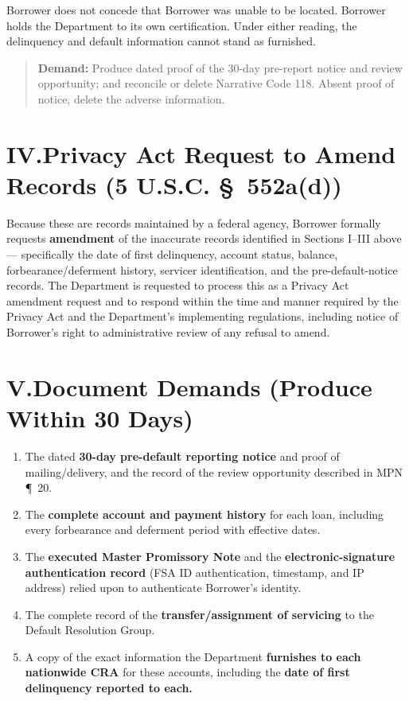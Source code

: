 \documentclass[11pt]{article}
\newcommand{\demand}[1]{\begin{quote}\textbf{Demand:} #1\end{quote}}
\begin{document}
\noindent Borrower does not concede that Borrower was unable to be located. Borrower holds the Department to its own certification. Under either reading, the delinquency and default information cannot stand as furnished.

\demand{Produce dated proof of the 30-day pre-report notice and review opportunity; and reconcile or delete Narrative Code 118. Absent proof of notice, delete the adverse information.}

\section*{IV.\quad Privacy Act Request to Amend Records (5 U.S.C. \S~552a(d))}

Because these are records maintained by a federal agency, Borrower formally requests \textbf{amendment} of the inaccurate records identified in Sections I--III above --- specifically the date of first delinquency, account status, balance, forbearance/deferment history, servicer identification, and the pre-default-notice records. The Department is requested to process this as a Privacy Act amendment request and to respond within the time and manner required by the Privacy Act and the Department's implementing regulations, including notice of Borrower's right to administrative review of any refusal to amend.

\section*{V.\quad Document Demands (Produce Within 30 Days)}

\begin{enumerate}
  \item The dated \textbf{30-day pre-default reporting notice} and proof of mailing/delivery, and the record of the review opportunity described in MPN \P~20.
  \item The \textbf{complete account and payment history} for each loan, including every forbearance and deferment period with effective dates.
  \item The \textbf{executed Master Promissory Note} and the \textbf{electronic-signature authentication record} (FSA ID authentication, timestamp, and IP address) relied upon to authenticate Borrower's identity.
  \item The complete record of the \textbf{transfer/assignment of servicing} to the Default Resolution Group.
  \item A copy of the exact information the Department \textbf{furnishes to each nationwide CRA} for these accounts, including the \textbf{date of first delinquency reported to each.}
\end{enumerate}
\end{document}
